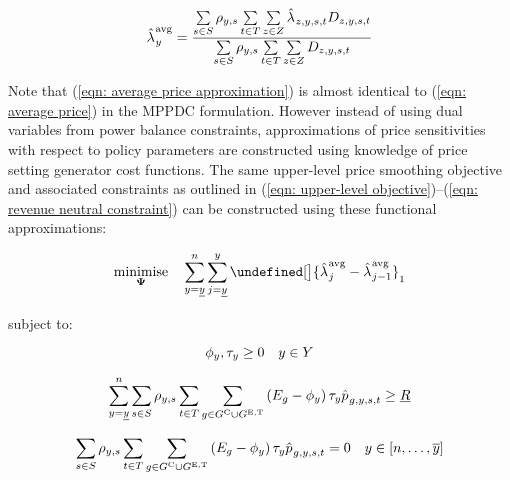 \documentclass{article}
\let\norm\undefined %
\DeclarePairedDelimiter\norm{\lVert}{\rVert}
\DeclareMathOperator*{\minimise}{minimise}
\begin{document}
\begin{equation}
	\hat{\dPowerBalance[]}_{\iYear}^{\mathrm{avg}} = \frac{\sum\limits_{\iScenario \in \sScenarios} \cScenarioDuration \sum\limits_{\iInterval \in \sIntervals}\sum\limits_{\iZone \in \sZones} \hat{\dPowerBalance[]}_{\iZone,\iYear,\iScenario,\iInterval} \cDemand}{\sum\limits_{\iScenario \in \sScenarios} \cScenarioDuration \sum\limits_{\iInterval \in \sIntervals}\sum\limits_{\iZone \in \sZones} \cDemand}
	\label{eqn: average price approximation}
\end{equation}

Note that (\ref{eqn: average price approximation}) is almost identical to (\ref{eqn: average price}) in the MPPDC formulation. However instead of using dual variables from power balance constraints, approximations of price sensitivities with respect to policy parameters are constructed using knowledge of price setting generator cost functions. The same upper-level price smoothing objective and associated constraints as outlined in (\ref{eqn: upper-level objective})--(\ref{eqn: revenue neutral constraint}) can be constructed using these functional approximations:

\begin{equation}
\minimise\limits_{\bm{\Psi}} \quad \sum\limits_{\iYear=\iYearStart}^{\iYearTransition} \sum\limits_{\iYearAlias=\iYearStart}^{\iYear} \norm[\big]{\hat{\dPowerBalance[]}_{\iYearAlias}^{\mathrm{avg}} - \hat{\dPowerBalance[]}_{\iYearAlias - 1}^{\mathrm{avg}}}_{1}
\label{eqn: upper-level objective approximation}
\end{equation}

subject to:

\begin{equation}
\phi_{y}, \tau_{y} \geq 0 \quad  y \in Y
\end{equation}

\begin{equation}
\sum\limits_{\iYear=\iYearStart}^{\iYearTransition} \sum\limits_{\iScenario \in \sScenarios} \cScenarioDuration \sum\limits_{\iInterval \in \sIntervals} \sum\limits_{\iGenerator \in \sGeneratorsCandidate \cup \sGeneratorsExistingThermal}\left(\cEmissionsIntensity -\vBaseline\right)\vPermitPrice \hat{\vPower[]}_{\iGenerator,\iYear,\iScenario,\iInterval} \geq \cMinimumCumulativeSchemeRevenue
\label{eqn: cumulative revenue constraint approximation}
\end{equation}

\begin{equation}
\sum\limits_{\iScenario \in \sScenarios} \cScenarioDuration \sum\limits_{\iInterval \in \sIntervals} \sum\limits_{\iGenerator \in \sGeneratorsCandidate \cup \sGeneratorsExistingThermal}\left(\cEmissionsIntensity -\vBaseline\right)\vPermitPrice \hat{\vPower[]}_{\iGenerator,\iYear,\iScenario,\iInterval} = 0 \quad  \iYear \in \left[\iYearTransition, \ldots, \iYearTerminal\right]	
\label{eqn: revenue neutral constraint approximation}
\end{equation}
\end{document}
